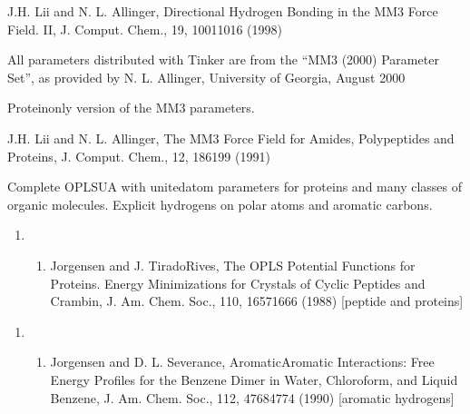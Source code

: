 \documentclass[letterpaper,11pt,english]{sphinxmanual}
\begin{document}
J.\sphinxhyphen{}H. Lii and N. L. Allinger, Directional Hydrogen Bonding in the MM3 Force Field. II, J. Comput. Chem., 19, 1001\sphinxhyphen{}1016 (1998)

All parameters distributed with Tinker are from the “MM3 (2000) Parameter Set”, as provided by N. L. Allinger, University of Georgia, August 2000


Protein\sphinxhyphen{}only version of the MM3 parameters.

J.\sphinxhyphen{}H. Lii and N. L. Allinger, The MM3 Force Field for Amides, Polypeptides and Proteins, J. Comput. Chem., 12, 186\sphinxhyphen{}199 (1991)


Complete OPLS\sphinxhyphen{}UA with united\sphinxhyphen{}atom parameters for proteins and many classes of organic molecules. Explicit hydrogens on polar atoms and aromatic carbons.
\begin{enumerate}
%
\setcounter{enumi}{22}
\item {} \begin{enumerate}
%
\setcounter{enumii}{11}
\item {} 
Jorgensen and J. Tirado\sphinxhyphen{}Rives, The OPLS Potential Functions for Proteins. Energy Minimizations for Crystals of Cyclic Peptides and Crambin, J. Am. Chem. Soc., 110, 1657\sphinxhyphen{}1666 (1988)  {[}peptide and proteins{]}

\end{enumerate}

\end{enumerate}
\begin{enumerate}
%
\setcounter{enumi}{22}
\item {} \begin{enumerate}
%
\setcounter{enumii}{11}
\item {} 
Jorgensen and D. L. Severance, Aromatic\sphinxhyphen{}Aromatic Interactions: Free Energy Profiles for the Benzene Dimer in Water, Chloroform, and Liquid Benzene, J. Am. Chem. Soc., 112, 4768\sphinxhyphen{}4774 (1990)  {[}aromatic hydrogens{]}

\end{enumerate}

\end{enumerate}
\end{document}
